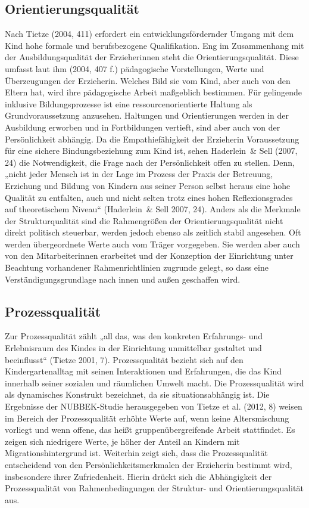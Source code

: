 \subsection{Orientierungsqualität}
Nach Tietze (2004, 411) erfordert ein entwicklungsfördernder Umgang mit dem Kind hohe formale und berufsbezogene Qualifikation. Eng im Zusammenhang mit der Ausbildungsqualität der Erzieherinnen steht die Orientierungsqualität. Diese umfasst laut ihm (2004, 407 f.) pädagogische Vorstellungen, Werte und Überzeugungen der Erzieherin. Welches Bild sie vom Kind, aber auch von den Eltern hat, wird ihre pädagogische Arbeit maßgeblich bestimmen. Für gelingende inklusive Bildungsprozesse ist eine ressourcenorientierte Haltung als Grundvoraussetzung anzusehen. Haltungen und Orientierungen werden in der Ausbildung erworben und in Fortbildungen vertieft, sind aber auch von der Persönlichkeit abhängig. 
Da die Empathiefähigkeit der Erzieherin Voraussetzung für eine sichere Bindungsbeziehung zum Kind ist, sehen Haderlein~\& Sell (2007, 24) die Notwendigkeit, die Frage nach der Persönlichkeit offen zu stellen. Denn, „nicht jeder Mensch ist in der Lage im Prozess der Praxis der Betreuung, Erziehung und Bildung von Kindern aus seiner Person selbst heraus eine hohe Qualität zu entfalten, auch und nicht selten trotz eines hohen Reflexionsgrades auf theoretischem Niveau“ (Haderlein~\& Sell 2007, 24). Anders als die Merkmale der Strukturqualität sind die Rahmengrößen der Orientierungsqualität nicht direkt politisch steuerbar, werden jedoch ebenso als zeitlich stabil angesehen. Oft werden übergeordnete Werte auch vom Träger vorgegeben. Sie werden aber auch von den Mitarbeiterinnen erarbeitet und der Konzeption der Einrichtung unter Beachtung vorhandener Rahmenrichtlinien zugrunde gelegt, so dass eine Verständigungsgrundlage nach innen und außen geschaffen wird. 

\subsection{Prozessqualität}\label{Prozessqualität}
Zur Prozessqualität zählt „all das, was den konkreten Erfahrungs- und Erlebnisraum des Kindes in der Einrichtung unmittelbar gestaltet und beeinflusst“ (Tietze 2001, 7). Prozessqualität bezieht sich auf den Kindergartenalltag mit seinen Interaktionen und Erfahrungen, die das Kind innerhalb seiner sozialen und räumlichen Umwelt macht. Die Prozessqualität wird als dynamisches Konstrukt bezeichnet, da sie situationsabhängig ist. Die Ergebnisse der NUBBEK-Studie herausgegeben von Tietze et al. (2012, 8) weisen im Bereich der Prozessqualität erhöhte Werte auf, wenn keine Altersmischung vorliegt und wenn offene, das heißt gruppenübergreifende Arbeit stattfindet. Es zeigen sich niedrigere Werte, je höher der Anteil an Kindern mit Migrationshintergrund ist. Weiterhin zeigt sich, dass die Prozessqualität entscheidend von den Persönlichkeitsmerkmalen der Erzieherin bestimmt wird, insbesondere ihrer Zufriedenheit. Hierin drückt sich die Abhängigkeit der Prozessqualität von Rahmenbedingungen der Struktur- und Orientierungsqualität aus.   


